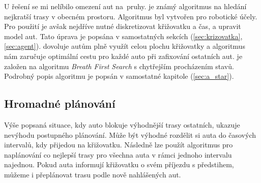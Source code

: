 U řešení \citet{Dresner} se mi nelíbilo omezení aut na~pruhy.
 je známý algoritmus na hledání nejkratší trasy v obecném prostoru.
Algoritmus byl vytvořen \citet*{Hart1968} pro robotické účely.
Pro použití  je avšak nejdříve nutné diskretizovat křižovatku a čas, a upravit model aut.
Tato úprava je popsána v samostatných sekcích (\ref{sec:krizovatka}, \ref{sec:agent}).
 dovoluje autům plně využít celou plochu křižovatky a algoritmus nám zaručuje optimální cestu pro každé auto při zafixování ostatních aut.
 je založen na algoritmu \emph{Breath First Search} s chytřejším procházením stavů.
Podrobný popis algoritmu je popsán v samostatné kapitole (\ref{sec:a_star}).

%

\subsection{Hromadné plánování}\label{subsec:hromadne_planovani}


Výše popsaná situace, kdy auto blokuje výhodnější trasy ostatních, ukazuje nevýhodu postupného plánování.
Může být výhodné rozdělit si auta do časových intervalů, kdy přijedou na křižovatku.
Následně lze použít algoritmus pro naplánování co nejlepší trasy pro všechna auta v rámci jednoho intervalu najednou.
Pokud auta informují křižovatku o svém příjezdu s předstihem, můžeme i přeplánovat trasu podle nově nahlášených aut.

%
%
%


